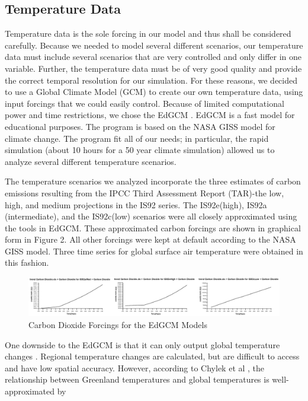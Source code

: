 \documentclass[12pt,a4paper,titlepage]{article}
\begin{document}
\subsection{Temperature Data}

Temperature data is the sole forcing in our model and thus shall
be considered carefully. Because we needed to model several
different scenarios, our temperature data must include several
scenarios that are very controlled and only differ in one
variable. Further, the temperature data must be of very good
quality and provide the correct temporal resolution for our
simulation. For these reasons, we decided to use a Global Climate
Model (GCM) to create our own temperature data, using input
forcings that we could easily control. Because of limited
computational power and time restrictions, we chose the EdGCM .
EdGCM is a fast model for educational purposes. The program is
based on the NASA GISS model for climate change. The program fit
all of our needs; in particular, the rapid simulation (about 10
hours for a 50 year climate simulation) allowed us to analyze
several different temperature scenarios.

The temperature scenarios we analyzed incorporate the three
estimates of carbon emissions resulting from the IPCC Third
Assessment Report (TAR)-the low, high, and medium projections in
the IS92 series. The IS92e(high), IS92a (intermediate), and the
IS92c(low) scenarios were all closely approximated using the tools
in EdGCM. These approximated carbon forcings are shown in
graphical form in Figure 2. All other forcings were kept at
default according to the NASA GISS model. Three time series for
global surface air temperature were obtained in this fashion.

\begin{figure}[!htb]
\centering
\includegraphics[width=1\textwidth]{fig02.eps}
\caption{Carbon Dioxide Forcings for the EdGCM Models}
\end{figure}

One downside to the EdGCM is that it can only output global
temperature changes . Regional temperature changes are calculated,
but are difficult to access and have low spatial accuracy.
However, according to Chylek et al , the relationship between
Greenland temperatures and global temperatures is
well-approximated by
\end{document}
